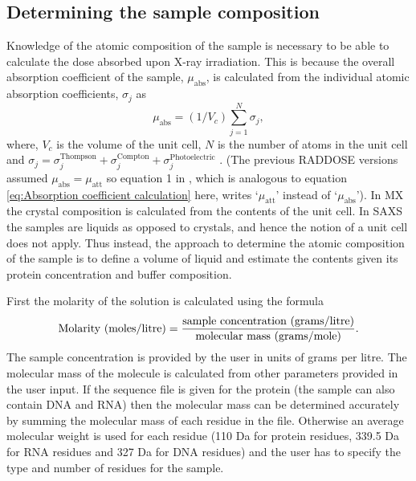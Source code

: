 \subsection{Determining the sample composition}
\label{sub:Determining the sample composition}
Knowledge of the atomic composition of the sample is necessary to be able to calculate the dose absorbed upon X-ray irradiation.
This is because the overall absorption coefficient of the sample, $\mu_{\text{abs}}$, is calculated from the individual atomic absorption coefficients, $\sigma_j$ as
\begin{equation}
    \mu_{\text{abs}} = (1/V_c) \sum_{j=1}^N \sigma_j,
    \label{eq:Absorption coefficient calculation}
\end{equation}
where, $V_c$ is the volume of the unit cell, $N$ is the number of atoms in the unit cell and $\sigma_j = \sigma_j^{\text{Thompson}} + \sigma_j^{\text{Compton}} + \sigma_j^{\text{Photoelectric}}$ \cite{murray2004}.
(The previous RADDOSE versions assumed $\mu_{\text{abs}} = \mu_{\text{att}}$ so equation 1 in \cite{murray2004}, which is analogous to equation \ref{eq:Absorption coefficient calculation} here, writes `$\mu_{\text{att}}$' instead of `$\mu_{\text{abs}}$').
In MX the crystal composition is calculated from the contents of the unit cell.
In SAXS the samples are liquids as opposed to crystals, and hence the notion of a unit cell does not apply.
Thus instead, the approach to determine the atomic composition of the sample is to define a volume of liquid and estimate the contents given its protein concentration and buffer composition.

First the molarity of the solution is calculated using the formula
\begin{equation}
    \text{Molarity (moles/litre)} = \frac{\text{sample concentration (grams/litre)}}{\text{molecular mass (grams/mole)}}.
    \label{eq:molarity calculation}
\end{equation}
The sample concentration is provided by the user in units of grams per litre.
The molecular mass of the molecule is calculated from other parameters provided in the user input.
If the sequence file is given for the protein (the sample can also contain DNA and RNA) then the molecular mass can be determined accurately by summing the molecular mass of each residue in the file.
Otherwise an average molecular weight is used for each residue (110 Da for protein residues, 339.5 Da for RNA residues and 327 Da for DNA residues) and the user has to specify the type and number of residues for the sample.

